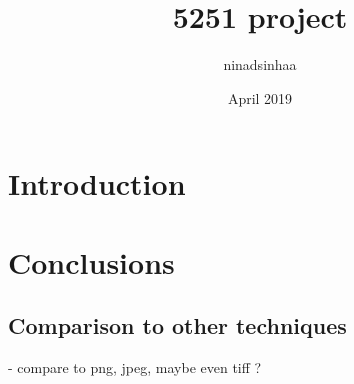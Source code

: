 \documentclass{article}
\title{5251 project}
\author{ninadsinhaa }
\date{April 2019}
\begin{document}
\maketitle

\section{Introduction}

\section{Conclusions}
\subsection{Comparison to other techniques}
- compare to png, jpeg, maybe even tiff ? 
\end{document}
